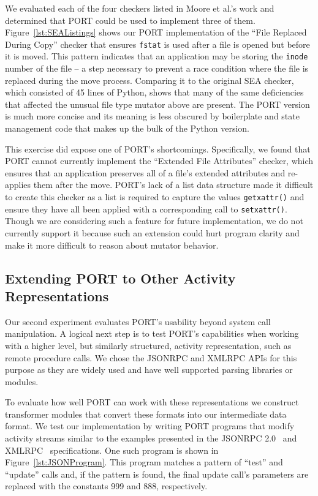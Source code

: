 We evaluated each of the four checkers listed in Moore et al.'s work and
determined that PORT could be used to implement three of them.
Figure~\ref{lst:SEAListings} shows our PORT implementation of
the ``File Replaced During Copy'' checker
that ensures {\tt fstat} is used after a file is opened but
before it is moved.  This pattern indicates that an application may be
storing the {\tt inode} number of the file -- a step necessary to prevent a race
condition where the file is replaced during the move process.
Comparing it to the
original SEA checker,
which consisted of 45 lines of Python,
shows that many of the same deficiencies that affected the unusual file type
mutator above are present.
The PORT version is much more concise and its meaning is
less obscured by boilerplate and state management code that makes up the
bulk of the Python version.

This exercise did expose one of PORT's shortcomings.  Specifically,
we found that PORT cannot currently implement the ``Extended File
Attributes'' checker, which
 ensures that an application
preserves all of a file's extended attributes and re-applies them after the move.
PORT's lack of a list data structure made it difficult to create this checker as a
list is required to capture the values {\tt getxattr()}
and ensure they have all been applied with a
corresponding call to {\tt setxattr()}.
Though we are considering such a feature for future implementation,
we do not currently support it because such an extension could
hurt program clarity and make it more difficult to reason about
mutator behavior.


\subsection{Extending PORT to Other Activity Representations}

Our second experiment evaluates PORT's usability beyond system call manipulation.
A logical next step is to test PORT's capabilities when working
with a higher level, but similarly structured, activity representation, such as remote procedure calls.
We chose the JSONRPC and XMLRPC APIs for this purpose as they are widely used and have well
supported parsing libraries or modules.

To evaluate how well PORT can work with these representations we
construct transformer modules that convert these formats into our
intermediate data format.
We test our implementation by writing PORT programs that modify
activity streams similar to the examples presented in the JSONRPC
2.0~\cite{jsonspec} and XMLRPC~\cite{xmlspec}
specifications.  One such program is shown in
Figure~\ref{lst:JSONProgram}.  This program matches a pattern of ``test''
and ``update'' calls and, if the pattern is found, the final update call's
parameters are replaced with the constants 999 and 888, respectively.


